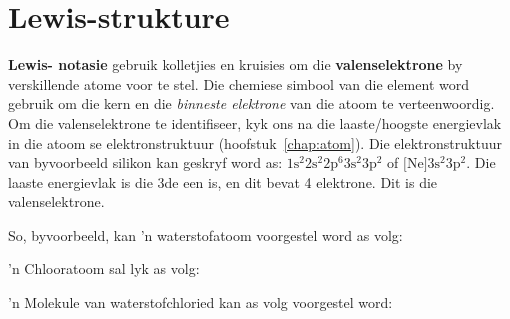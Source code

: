          \section{Lewis-strukture}
    \nopagebreak

\textbf{Lewis- notasie} gebruik kolletjies en kruisies om die \textbf{valenselektrone} by verskillende atome voor te stel. Die chemiese simbool van die element word gebruik om die kern en die \textsl{binneste elektrone} van die atoom te verteenwoordig. Om die valenselektrone te identifiseer, kyk ons na die laaste/hoogste energievlak in die atoom se elektronstruktuur (hoofstuk~\ref{chap:atom}). Die elektronstruktuur van byvoorbeeld silikon kan geskryf word as: $1\text{s}^{2}2\text{s}^{2}2\text{p}^{6}3\text{s}^{2}3\text{p}^{2}$ of $\text{[Ne]}3\text{s}^{2}3\text{p}^{2}$. Die laaste energievlak is die 3de een is, en dit bevat 4 elektrone. Dit is die valenselektrone.
 \par 
So, byvoorbeeld, kan 'n waterstofatoom voorgestel word as volg:  

 'n Chlooratoom sal lyk as volg: 

 'n Molekule van waterstofchloried kan as volg voorgestel word:
\begin{center}
\end{center}

